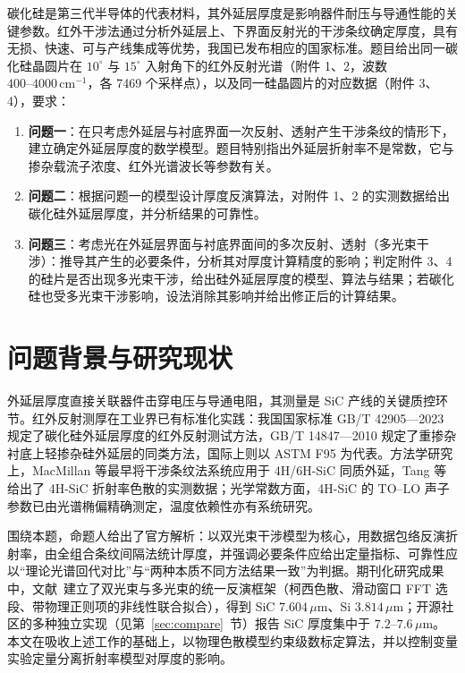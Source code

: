 \documentclass[11pt,a4paper,fontset=fandol]{ctexart}
\newcommand{\um}{\,\mu\mathrm{m}}
\newcommand{\invcm}{\,\mathrm{cm^{-1}}}
\begin{document}
碳化硅是第三代半导体的代表材料，其外延层厚度是影响器件耐压与导通性能的关键参数。红外干涉法通过分析外延层上、下界面反射光的干涉条纹确定厚度，具有无损、快速、可与产线集成等优势，我国已发布相应的国家标准\cite{gbt42905}。题目给出同一碳化硅晶圆片在 $10^\circ$ 与 $15^\circ$ 入射角下的红外反射光谱（附件 1、2，波数 $400\text{--}4000\invcm$，各 7469 个采样点），以及同一硅晶圆片的对应数据（附件 3、4），要求：

\begin{enumerate}[label=（\arabic*）, leftmargin=2.4em, itemsep=0.1em]
    \item \textbf{问题一}：在只考虑外延层与衬底界面一次反射、透射产生干涉条纹的情形下，建立确定外延层厚度的数学模型。题目特别指出外延层折射率不是常数，它与掺杂载流子浓度、红外光谱波长等参数有关。
    \item \textbf{问题二}：根据问题一的模型设计厚度反演算法，对附件 1、2 的实测数据给出碳化硅外延层厚度，并分析结果的可靠性。
    \item \textbf{问题三}：考虑光在外延层界面与衬底界面间的多次反射、透射（多光束干涉）：推导其产生的必要条件，分析其对厚度计算精度的影响；判定附件 3、4 的硅片是否出现多光束干涉，给出硅外延层厚度的模型、算法与结果；若碳化硅也受多光束干涉影响，设法消除其影响并给出修正后的计算结果。
\end{enumerate}

\section{问题背景与研究现状}

外延层厚度直接关联器件击穿电压与导通电阻，其测量是 SiC 产线的关键质控环节。红外反射测厚在工业界已有标准化实践：我国国家标准 GB/T 42905—2023 规定了碳化硅外延层厚度的红外反射测试方法\cite{gbt42905}，GB/T 14847—2010 规定了重掺杂衬底上轻掺杂硅外延层的同类方法\cite{gbt14847}，国际上则以 ASTM F95 为代表\cite{astmf95}。方法学研究上，MacMillan 等最早将干涉条纹法系统应用于 4H/6H-SiC 同质外延\cite{macmillan1998}，Tang 等给出了 4H-SiC 折射率色散的实测数据\cite{tang2009}；光学常数方面，4H-SiC 的 TO--LO 声子参数已由光谱椭偏精确测定\cite{madan2024}，温度依赖性亦有系统研究\cite{tong2018}。

围绕本题，命题人给出了官方解析\cite{xue2026}：以双光束干涉模型为核心，用数据包络反演折射率，由全组合条纹间隔法统计厚度，并强调必要条件应给出定量指标、可靠性应以``理论光谱回代对比''与``两种本质不同方法结果一致''为判据。期刊化研究成果中，文献~\cite{zhu2026}建立了双光束与多光束的统一反演框架（柯西色散、滑动窗口 FFT 选段、带物理正则项的非线性联合拟合），得到 SiC $7.604\um$、Si $3.814\um$；开源社区的多种独立实现（见第~\ref{sec:compare}~节）报告 SiC 厚度集中于 $7.2$--$7.6\um$。本文在吸收上述工作的基础上，以物理色散模型约束级数标定算法，并以控制变量实验定量分离折射率模型对厚度的影响。
\end{document}
